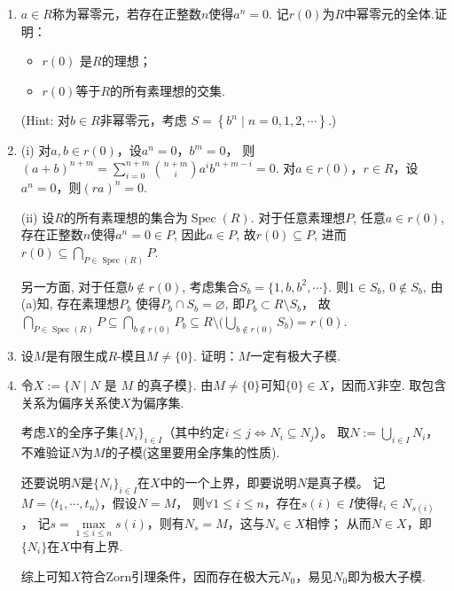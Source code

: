 \begin{enumerate}
    \item[(b)]$a \in R$称为幂零元，若存在正整数$n$使得$a^{n}=0$. 
        记$r(0)$为$R$中幂零元的全体.证明：
        \begin{itemize}
            \item[(i)] $r(0)$ 是$R$的理想；
            \item[(ii)] $r(0)$等于$R$的所有素理想的交集.
        \end{itemize}
        (Hint: 对$b \in R$非幂零元，考虑 $S=\left\{b^{n} \mid n=0,1,2,\cdots \right\}$.)

    \item[\textbf{证明:}]
        (i) 对$a,b\in r(0)$，设$a^n=0$，$b^m=0$，
        则$(a+b)^{n+m}=\sum\limits_{i=0}^{n+m}
        \binom{n+m}{i}a^i b^{n+m-i}=0$.
        对$a\in r(0)$，$r\in R$，设$a^n=0$，则$(ra)^n=0$.

        (ii)
        设$R$的所有素理想的集合为$\operatorname{Spec}(R)$. 
        对于任意素理想$P$, 任意$a\in r(0)$, 存在正整数$n$使得$a^n=0\in P$, 
        因此$a\in P$, 故$r(0)\subseteq P$, 
        进而$r(0)\subseteq \bigcap\limits_{P\in \operatorname{Spec}(R)} P$.\par
        另一方面, 对于任意$b\notin r(0)$, 考虑集合$S_b=\{1,b,b^2,\cdots\}$. 
        则$1\in S_b$, $0\notin S_b$, 由(a)知, 存在素理想$P_b$
        使得$P_b\cap S_b=\varnothing$, 即$P_b\subset R\setminus S_b$，
        故$\bigcap\limits_{P\in \operatorname{Spec}(R)} P
        \subseteq \bigcap\limits_{b\notin r(0)} P_b
        \subseteq R\setminus \Big(\bigcup\limits_{b\notin r(0)} S_b\Big)=r(0)$.

    \item[1.4]
    设$M$是有限生成$R$-模且$M \neq \{0\}$. 证明：$M$一定有极大子模.
    \item[\textbf{证明:}]
    令$X:=\{N\mid N\text{ 是 }M\text{ 的真子模}\}$. 
    由$M\neq \{0\}$可知$\{0\}\in X$，因而$X$非空. 
    取包含关系为偏序关系使$X$为偏序集.\par
    考虑$X$的全序子集$\{N_i\}_{i \in I}$（其中约定$i\le j \Leftrightarrow N_i\subseteq N_j$）。
    取$N:=\bigcup\limits_{i \in I}N_i$，不难验证$N$为$M$的子模(这里要用全序集的性质).\par
    还要说明$N$是$\{N_i\}_{i \in I}$在$X$中的一个上界，即要说明$N$是真子模。
    记$M=\langle t_1,\cdots,t_n\rangle$，假设$N=M$，
    则$\forall 1 \leq i \leq n$，存在$s(i)\in I$使得$t_i \in N_{s(i)}$，
    记$s=\max\limits_{1\le i\le n}s(i)$，则有$N_s=M$，这与$N_s \in X$相悖；
    从而$N\in X$，即$\{N_i\}$在$X$中有上界.\par
    综上可知$X$符合Zorn引理条件，因而存在极大元$N_0$，易见$N_0$即为极大子模.


\end{enumerate}
